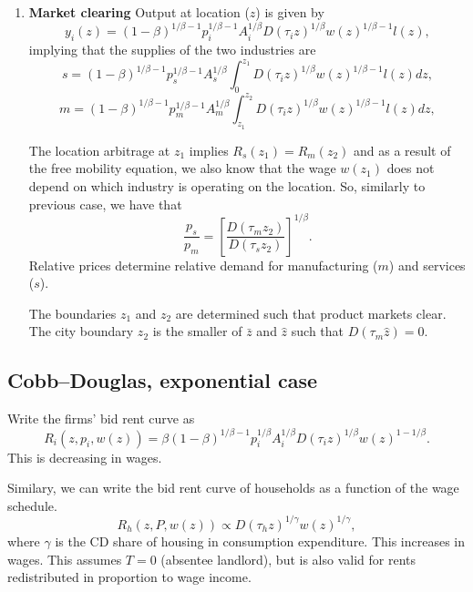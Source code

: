 \documentclass[10pt]{article}
\begin{document}
\begin{enumerate}
\item \textbf{Market clearing}
Output at location ($z$) is given by
\begin{equation*}
y_i(z)=(1-\beta)^{1/\beta-1}p_i^{1/\beta-1}A_i^{1/\beta}D(\tau_iz)^{1/\beta}w(z)^{1/\beta-1}l(z),
\end{equation*}
implying that the supplies of the two industries are
\begin{equation*}
s=(1-\beta)^{1/\beta-1}p_s^{1/\beta-1}A_s^{1/\beta}\int_0^{z_1}D(\tau_iz)^{1/\beta}w(z)^{1/\beta-1}l(z)dz,
\end{equation*}
\begin{equation*}
m=(1-\beta)^{1/\beta-1}p_m^{1/\beta-1}A_m^{1/\beta}\int_{z_1}^{z_2}D(\tau_iz)^{1/\beta}w(z)^{1/\beta-1}l(z)dz,
\end{equation*}

The location arbitrage at $z_1$ implies $R_s(z_1)=R_m(z_2)$ and as a result of the free mobility equation, we also know that the wage $w(z_1)$ does not depend on which industry is operating on the location. So, similarly to previous case, we have that
\begin{equation}
\frac{p_s}{p_m}=\left[\frac{D(\tau_mz_2)}{D(\tau_sz_2)}\right]^{1/\beta}.
\end{equation}
Relative prices determine relative demand for manufacturing ($m$) and services ($s$).

The boundaries $z_1$ and $z_2$ are determined such that product markets clear. The city boundary $z_2$ is the smaller of $\bar{z}$ and $\hat{z}$ such that $D(\tau_m\hat{z})=0$.
\end{enumerate}

\subsection{Cobb--Douglas, exponential case}
Write the firms' bid rent curve as
\begin{equation*}
R_i(z,p_i,w(z)) = \beta (1-\beta)^{1/\beta-1} p_i^{1/\beta} A_i^{1/\beta} D(\tau_i z)^{1/\beta}w(z)^{1-1/\beta}.
\end{equation*}
This is decreasing in wages.

Similary, we can write the bid rent curve of households as a function of the wage schedule.
\[
R_h(z,P,w(z)) \propto D(\tau_h z)^{1/\gamma}w(z)^{1/\gamma},
\]
where $\gamma$ is the CD share of housing in consumption expenditure. This increases in wages. This assumes $T=0$ (absentee landlord), but is also valid for rents redistributed in proportion to wage income. 
\end{document}
